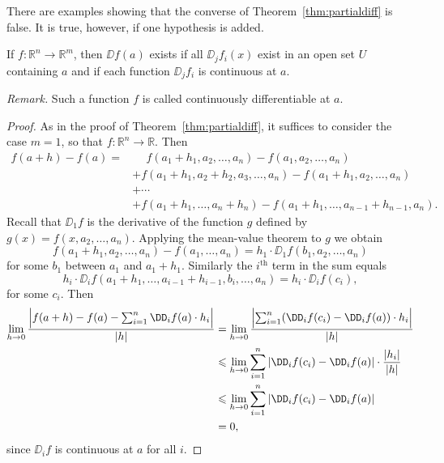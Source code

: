 \documentclass[11pt]{article}
\begin{document}
There are examples showing that the converse of
Theorem~\ref{thm:partialdiff} is false.  It is true, however, if one
hypothesis is added.

\begin{thm}
  \label{thm:contdiff}
If $f: \mathbb{R}^n \rightarrow \mathbb{R}^m$, then $\DD f(a)$ exists if all $\DD_j f_i(x)$ exist in an open set $U$ containing $a$ and if each function $\DD_j f_i$ is continuous at $a$.
\end{thm}

\noindent\textit{Remark.} Such a function $f$ is called \textsf{continuously
  differentiable} at $a$.

\begin{proof}
As in the proof of Theorem~\ref{thm:partialdiff}, it suffices to consider the case $m = 1$, so that $f: \mathbb{R}^n \rightarrow \mathbb{R}$.  Then
\begin{align*}
    f(a+h) - f(a) = &\phantom{+} f(a_1 + h_1, a_2, \dots, a_n) -
    f(a_1, a_2, \dots, a_n) \\
    &+ f(a_1 + h_1, a_2 + h_2, a_3, \dots, a_n) - f(a_1 + h_1, a_2,
    \dots, a_n) \\
    &+ \cdots \\
    &+ f(a_1 + h_1, \dots, a_n + h_n) - f(a_1+h_1, \dots, a_{n-1} +
    h_{n-1}, a_n).
\end{align*}
Recall that $\DD_1 f$ is the derivative of the function $g$ defined by
$g(x) = f(x, a_2, \dots, a_n)$.  Applying the mean-value theorem to
$g$ we obtain
\begin{equation*}
  f(a_1 + h_1, a_2, \dots, a_n) - f(a_1, \dots, a_n) = h_1 \cdot \DD_1 f(b_1, a_2, \dots, a_n)
\end{equation*}
for some $b_1$ between $a_1$ and $a_1 + h_1$.  Similarly the
$i^{\text{th}}$ term in the sum equals
\begin{equation*}
  h_i \cdot \DD_i f(a_1 + h_1, \dots, a_{i-1} + h_{i-1}, b_i, \dots,
  a_n) = h_i \cdot \DD_i f(c_i),
\end{equation*}
for some $c_i$.  Then
\begin{align*}
    \lim_{h \rightarrow 0} \frac{ \Bigl| f(a+h) - f(a) - \sum_{i=1}^n
    \DD_i f(a) \cdot h_i \Bigr| }{ |h| } 
  & = \lim_{h \rightarrow 0} \frac{ \Bigl| \sum_{i=1}^n (\DD_i f(c_i) -
    \DD_i f(a) ) \cdot h_i \Bigr| }{ |h| } \\
  & \leqslant \lim_{h \rightarrow 0} \sum_{i = 1}^n | \DD_i f(c_i) - \DD_i f(a)
    | \cdot \frac{ |h_i| }{ |h| } \\
    & \leqslant \lim_{h \rightarrow 0} \sum_{i = 1}^n | \DD_i f(c_i) -
    \DD_i f(a) | \\ & = 0,
\end{align*}
since $\DD_i f$ is continuous at $a$ for all $i$.
\end{proof}
\end{document}
